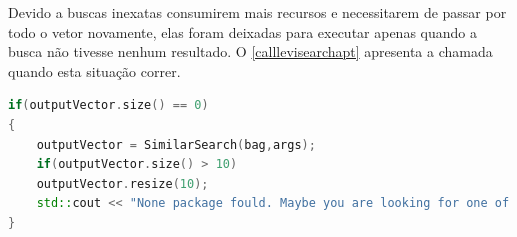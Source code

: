 Devido a buscas inexatas consumirem mais recursos e necessitarem de passar por todo o vetor novamente, elas foram deixadas para executar apenas quando a busca não tivesse nenhum resultado. O \autoref{calllevisearchapt} apresenta a chamada quando esta situação correr.

\begin{lstlisting}[language=C++,label=calllevisearchapt,caption={Chamada seletiva para buscas inexatas}]
if(outputVector.size() == 0)
{
	outputVector = SimilarSearch(bag,args);
	if(outputVector.size() > 10)
	outputVector.resize(10);
	std::cout << "None package fould. Maybe you are looking for one of those:" << std::endl;
}
\end{lstlisting}
